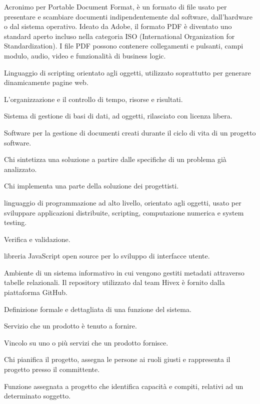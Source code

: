 \item[PDF] Acronimo per Portable Document Format, è un formato di file usato per presentare e scambiare documenti indipendentemente dal software, dall'hardware o dal sistema operativo. Ideato da Adobe, il formato PDF è diventato uno standard aperto incluso nella categoria ISO (International Organization for Standardization). I file PDF possono contenere collegamenti e pulsanti, campi modulo, audio, video e funzionalità di business logic.
\item[PHP] Linguaggio di scripting orientato agli oggetti, utilizzato soprattutto per generare dinamicamente pagine web.
\item[pianificazione] L'organizzazione e il controllo di tempo, risorse e risultati.
\item[PostgreSQL] Sistema di gestione di basi di dati, ad oggetti, rilasciato con licenza libera.
\item[PragmaDB] Software per la gestione di documenti creati durante il ciclo di vita di un progetto software.
\item[progettista] Chi sintetizza una soluzione a partire dalle specifiche di un problema già analizzato.
\item[programmatore] Chi implementa una parte della soluzione dei progettisti.
\item[Python] linguaggio di programmazione ad alto livello, orientato agli oggetti, usato per sviluppare applicazioni distribuite, scripting, computazione numerica e system testing.
\item[qualifica] Verifica e validazione.
\item[React.js] libreria JavaScript open source per lo sviluppo di interfacce utente.
\item[repository] Ambiente di un sistema informativo in cui vengono gestiti metadati attraverso tabelle relazionali. Il repository utilizzato dal team Hivex è fornito dalla piattaforma GitHub.
\item[requisito di sistema] Definizione formale e dettagliata di una funzione del sistema.
\item[requisito funzionale] Servizio che un prodotto è tenuto a fornire.
\item[requisito non funzionale] Vincolo su uno o più servizi che un prodotto fornisce.
\item[responsabile di progetto] Chi pianifica il progetto, assegna le persone ai ruoli giusti e rappresenta il progetto presso il  committente.
\item[ruolo] Funzione assegnata a progetto che identifica capacità e compiti, relativi ad un determinato soggetto.
